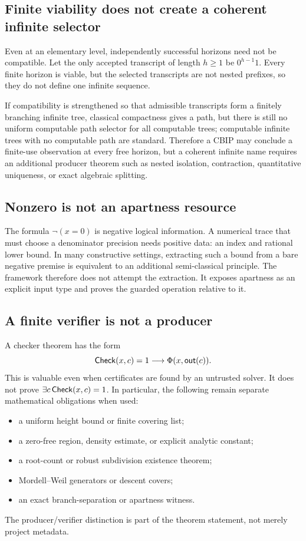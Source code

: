 \subsection{Finite viability does not create a coherent infinite selector}

Even at an elementary level, independently successful horizons need not be compatible.  Let the only accepted transcript of length \(h\geq1\) be \(0^{h-1}1\).  Every finite horizon is viable, but the selected transcripts are not nested prefixes, so they do not define one infinite sequence.

If compatibility is strengthened so that admissible transcripts form a finitely branching infinite tree, classical compactness gives a path, but there is still no uniform computable path selector for all computable trees; computable infinite trees with no computable path are standard.  Therefore a CBIP may conclude a finite-use observation at every free horizon, but a coherent infinite name requires an additional producer theorem such as nested isolation, contraction, quantitative uniqueness, or exact algebraic splitting.

\subsection{Nonzero is not an apartness resource}

The formula \(\neg(x=0)\) is negative logical information.  A numerical trace that must choose a denominator precision needs positive data: an index and rational lower bound.  In many constructive settings, extracting such a bound from a bare negative premise is equivalent to an additional semi-classical principle.  The framework therefore does not attempt the extraction.  It exposes apartness as an explicit input type and proves the guarded operation relative to it.

\subsection{A finite verifier is not a producer}

A checker theorem has the form
\[
  \mathsf{Check}(x,c)=1\longrightarrow \Phi(x,\mathsf{out}(c)).
\]
This is valuable even when certificates are found by an untrusted solver.  It does not prove \(\exists c\,\mathsf{Check}(x,c)=1\).  In particular, the following remain separate mathematical obligations when used:
\begin{itemize}
\item a uniform height bound or finite covering list;
\item a zero-free region, density estimate, or explicit analytic constant;
\item a root-count or robust subdivision existence theorem;
\item Mordell--Weil generators or descent covers;
\item an exact branch-separation or apartness witness.
\end{itemize}

The producer/verifier distinction is part of the theorem statement, not merely project metadata.
